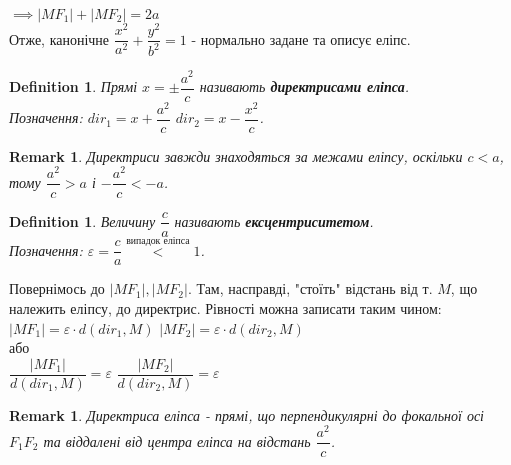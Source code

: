 \documentclass[a4paper, 10pt]{extarticle}
\def\bigline{\vspace{5mm}\\}
\theoremstyle{theoremdd}
\theoremstyle{theoremdd}
\newtheorem{definition}[theorem]{Definition}
\theoremstyle{theoremdd}
\theoremstyle{theoremdd}
\theoremstyle{theoremdd}
\theoremstyle{theoremdd}
\newtheorem{remark}[theorem]{Remark}
\theoremstyle{theoremdd}
\theoremstyle{theoremdd}
\begin{document}
$\implies |MF_1| + |MF_2| = 2a$
\bigline
Отже, канонічне $\dfrac{x^2}{a^2} + \dfrac{y^2}{b^2} = 1$ - нормально задане та описує еліпс.
\begin{figure}[H]
\centering
{}
\end{figure}

\begin{definition}
Прямі $x = \pm \dfrac{a^2}{c}$ називають \textbf{директрисами еліпса}.\\
Позначення: $dir_1 = x + \dfrac{a^2}{c}$ \hspace{1cm} $dir_2 = x - \dfrac{x^2}{c}$.
\end{definition}

\begin{remark}
Директриси завжди знаходяться за межами еліпсу, оскільки $c < a$, тому $\dfrac{a^2}{c} > a$ і $-\dfrac{a^2}{c} < -a$.
\end{remark}

\begin{definition}
Величину $\dfrac{c}{a}$ називають \textbf{ексцентриситетом}.\\
Позначення: $\varepsilon = \dfrac{c}{a} \overset{\text{випадок еліпса}}{<} 1$.
\end{definition}

Повернімось до $|MF_1|,|MF_2|$. Там, насправді, "стоїть" \textrm{} відстань від т. $M$, що належить еліпсу, до директрис. Рівності можна записати таким чином:\\
$|MF_1| = \varepsilon \cdot d(dir_1, M)$ \hspace{1cm} $|MF_2| = \varepsilon \cdot d(dir_2, M)$\\
або\\
$\dfrac{|MF_1|}{d(dir_1, M)} = \varepsilon$ \hspace{1cm} $\dfrac{|MF_2|}{d(dir_2, M)} = \varepsilon$

\begin{remark}
Директриса еліпса - прямі, що перпендикулярні до фокальної осі $F_1F_2$ та віддалені від центра еліпса на відстань $\dfrac{a^2}{c}$.
\end{remark}
\end{document}
